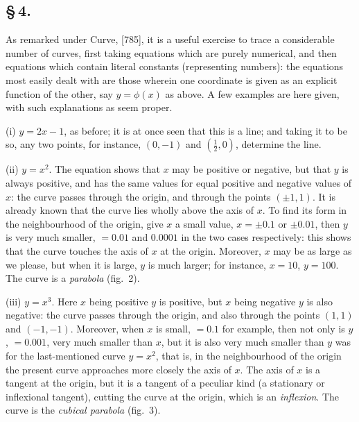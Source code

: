 \documentclass[11pt,a4paper]{book}
\begin{document}
\subsection*{\S\,4.}

As remarked under Curve, [785], it is a useful exercise to trace a considerable number of curves, first taking equations which are purely numerical, and then equations which contain literal constants (representing numbers): the equations most easily dealt with are those wherein one coordinate is given as an explicit function of the other, say $y = \phi(x)$ as above. A few examples are here given, with such explanations as seem proper.

(i) $y = 2x - 1$, as before; it is at once seen that this is a line; and taking it to be so, any two points, for instance, $(0, -1)$ and $(\frac{1}{2}, 0)$, determine the line.

(ii) $y = x^{2}$. The equation shows that $x$ may be positive or negative, but that $y$ is always positive, and has the same values for equal positive and negative values of $x$: the curve passes through the origin, and through the points $(\pm 1, 1)$. It is already known that the curve lies wholly above the axis of $x$. To find its form in the neighbourhood of the origin, give $x$ a small value, $x = \pm 0.1$ or $\pm 0.01$, then $y$ is very much smaller, $= 0.01$ and $0.0001$ in the two cases respectively: this shows that the curve touches the axis of $x$ at the origin. Moreover, $x$ may be as large as we please, but when it is large, $y$ is much larger; for instance, $x = 10$, $y = 100$. The curve is a \textit{parabola} (fig.~2).

(iii) $y = x^{3}$. Here $x$ being positive $y$ is positive, but $x$ being negative $y$ is also negative: the curve passes through the origin, and also through the points $(1, 1)$ and $(-1, -1)$. Moreover, when $x$ is small, $= 0.1$ for example, then not only is $y$, $= 0.001$, very much smaller than $x$, but it is also very much smaller than $y$ was for the last-mentioned curve $y = x^{2}$, that is, in the neighbourhood of the origin the present curve approaches more closely the axis of $x$. The axis of $x$ is a tangent at the origin, but it is a tangent of a peculiar kind (a stationary or inflexional tangent), cutting the curve at the origin, which is an \textit{inflexion}. The curve is the \textit{cubical parabola} (fig.~3).
\end{document}
